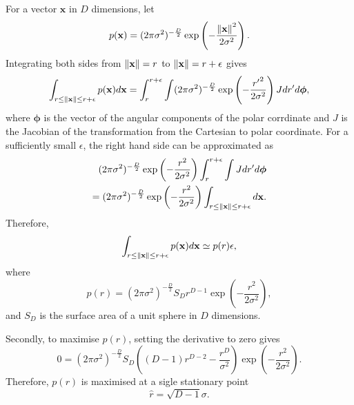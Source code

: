 \subsection{}
For a vector $\mathbf{x}$ in $D$ dimensions, let 
%
\begin{equation}
p(\mathbf{x}) = (2 \pi \sigma ^ 2) ^ {- \frac{D}{2}} \exp \left( - \frac{\norm{\mathbf{x}} ^ 2}{2 \sigma ^2} \right).
\end{equation}
%
Integrating both sides from $\norm{\mathbf{x}} = r$ to $\norm{\mathbf{x}} = r + \epsilon$ gives
%
\begin{equation}
\int_{r \leq \norm{\mathbf{x}} \leq r + \epsilon} p(\mathbf{x}) d\mathbf{x} = \int_{r}^{r + \epsilon} \int (2 \pi \sigma ^ 2) ^ {- \frac{D}{2}} \exp \left( - \frac{{r'} ^ 2}{2 \sigma ^2} \right) J dr' d\bm{\phi},
\end{equation}
%
where $\bm{\phi}$ is the vector of the angular components of the polar corrdinate and $J$ is the Jacobian of the transformation from the Cartesian to polar coordinate.
For a sufficiently small $\epsilon$, the right hand side can be approximated as
%
\begin{equation}
\begin{aligned}
(2 \pi \sigma ^ 2) ^ {- \frac{D}{2}} \exp \left( - \frac{r ^ 2}{2 \sigma ^2} \right) \int_{r}^{r + \epsilon} \int J dr' d\bm{\phi} \\
= (2 \pi \sigma ^ 2) ^ {- \frac{D}{2}} \exp \left( - \frac{r ^ 2}{2 \sigma ^2} \right) \int_{r \leq \norm{\mathbf{x}} \leq r + \epsilon} d\mathbf{x}.
\end{aligned}
\end{equation}
%
Therefore,
%
\begin{equation}
\int_{r \leq \norm{\mathbf{x}} \leq r + \epsilon} p(\mathbf{x}) d\mathbf{x} \simeq p(r) \epsilon,
\end{equation}
%
where
%
\begin{equation}
p(r) = (2 \pi \sigma ^ 2) ^ {- \frac{D}{2}} S_D r ^ {D - 1} \exp \left( - \frac{r ^ 2}{2 \sigma ^2} \right),
\end{equation}
%
and $S_D$ is the surface area of a unit sphere in $D$ dimensions.

Secondly, to maximise $p(r)$, setting the derivative to zero gives
%
\begin{equation}
0 = (2 \pi \sigma ^ 2) ^ {- \frac{D}{2}} S_D \left( (D - 1) r ^ {D - 2} - \frac{r ^ D}{\sigma ^ 2} \right) \exp \left( - \frac{r ^ 2}{2 \sigma ^2} \right).
\end{equation}
%
Therefore, $p(r)$ is maximised at a sigle stationary point
%
\begin{equation}
\hat{r} = \sqrt{D - 1} \sigma.
\end{equation}
%

